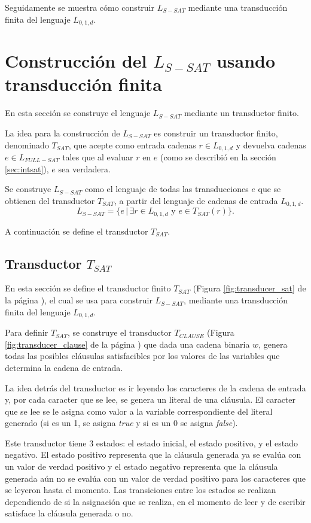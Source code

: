 \documentclass[12pt]{article}
\newcommand{\true}{\textit{true}}
\newcommand{\false}{\textit{false}}
\begin{document}
Seguidamente se muestra cómo construir $L_{S-SAT}$ mediante una transducción finita del lenguaje $L_{0,1,d}$.

\section{Construcción del $L_{S-SAT}$ usando transducción finita}

En esta sección se construye el lenguaje $L_{S-SAT}$ mediante un transductor finito.

La idea para la construcción de $L_{S-SAT}$ es construir un transductor finito, denominado $T_{SAT}$, que acepte como entrada cadenas $r\in L_{0,1,d}$ y devuelva cadenas $e\in L_{FULL-SAT}$ tales que al evaluar $r$ en $e$ (como se describió en la sección \ref{sec:intsat}), $e$ sea verdadera.

Se construye $L_{S-SAT}$ como el lenguaje de todas las transducciones $e$ que se obtienen del transductor $T_{SAT}$, a partir del lenguaje de cadenas de entrada $L_{0,1,d}$.
$$L_{S-SAT} = \{e\,|\,\exists r \in L_{0,1,d} \text{ y } e \in T_{SAT}(r) \}.$$

A continuación se define el transductor $T_{SAT}$.

\subsection{Transductor $T_{SAT}$}
\label{sec:tsat}

En esta sección se define el transductor finito $T_{SAT}$ (Figura \ref{fig:transducer_sat} de la página \pageref{fig:transducer_sat}), el cual se usa para construir $L_{S-SAT}$, mediante una transducción finita del lenguaje $L_{0,1,d}$.

Para definir $T_{SAT}$, se construye el transductor $T_{CLAUSE}$ (Figura \ref{fig:transducer_clause} de la página \pageref{fig:transducer_clause}) que dada una cadena binaria $w$, genera todas las posibles cláusulas satisfacibles por los valores de las variables que determina la cadena de entrada.

La idea detrás del transductor es ir leyendo los caracteres de la cadena de entrada y, por cada caracter que se lee, se genera un literal de una cláusula. El caracter que se lee se le asigna como valor a la variable correspondiente del literal generado (si es un 1, se asigna \true{} y si es un 0 se asigna \false{}).

Este transductor tiene 3 estados: el estado inicial, el estado positivo, y el estado negativo.  
El estado positivo representa que la cláusula generada ya se evalúa con un valor de verdad positivo y 
el estado negativo representa que la cláusula generada aún no se evalúa con un valor de verdad positivo 
para los caracteres que se leyeron hasta el momento. Las transiciones entre los estados se realizan 
dependiendo de si la asignación que se realiza, en el momento de leer y de escribir satisface la cláusula 
generada o no.
\end{document}
